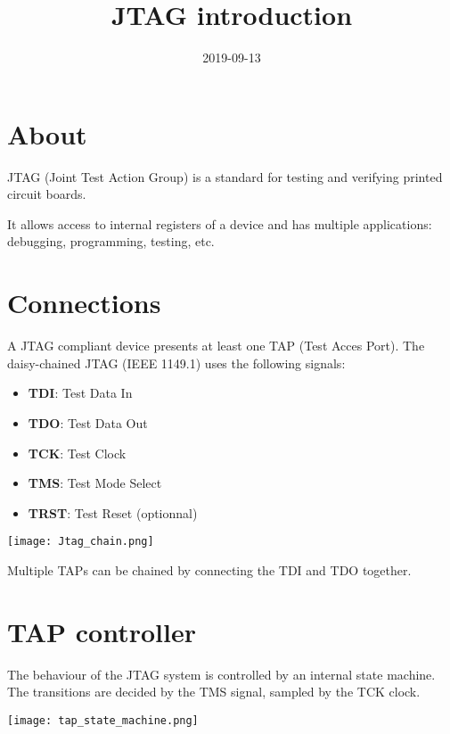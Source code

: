 \documentclass{article}
\title{JTAG introduction}
\date{2019-09-13}
\begin{document}
	\maketitle
	
	\section{About}
	
	JTAG (Joint Test Action Group) is a standard for testing and verifying printed circuit boards.
	
	It allows access to internal registers of a device and has multiple applications: debugging, programming, testing, etc.
	
	\section{Connections}
	
	A JTAG compliant device presents at least one TAP (Test Acces Port). The daisy-chained JTAG (IEEE 1149.1) uses the following signals:
	
	\begin{itemize}
	\item \textbf{TDI}: Test Data In
	\item \textbf{TDO}: Test Data Out
	\item \textbf{TCK}: Test Clock
	\item \textbf{TMS}: Test Mode Select
	\item \textbf{TRST}: Test Reset (optionnal)
	\end{itemize}
	
	\begin{center}
	\texttt{[image: Jtag\_chain.png]}
	\end{center}
	
	Multiple TAPs can be chained by connecting the TDI and TDO together.
	
	\section{TAP controller}
	
	The behaviour of the JTAG system is controlled by an internal state machine. The transitions are decided by the TMS signal, sampled by the TCK clock.
	
	\begin{center}
	\texttt{[image: tap\_state\_machine.png]}
	\end{center}
	
\end{document}
